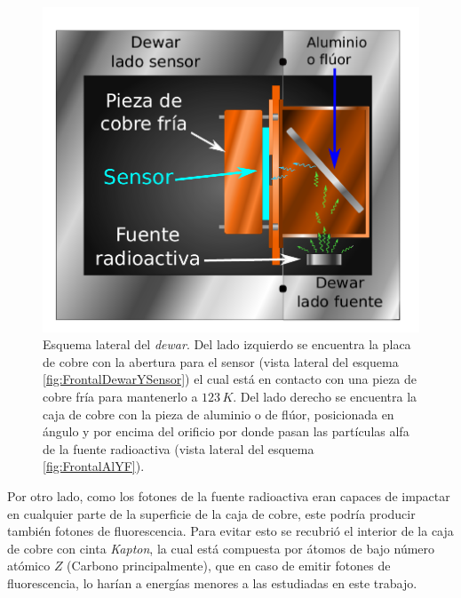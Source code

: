 \begin{figure}%
    \centering
    \includegraphics[scale=0.7]{Figs/LateralDewar.pdf}
    \caption{Esquema lateral del \textit{dewar}. Del lado izquierdo se encuentra la placa de cobre con la abertura para el sensor (vista lateral del esquema \ref{fig:FrontalDewarYSensor}) el cual está en contacto con una pieza de cobre fría para mantenerlo a $123\,\si{K}$. Del lado derecho se encuentra la caja de cobre con la pieza de aluminio o de flúor, posicionada en ángulo y por encima del orificio por donde pasan las partículas alfa de la fuente radioactiva (vista lateral del esquema \ref{fig:FrontalAlYF}).}
    \label{fig:LateralDewar}
\end{figure}
Por otro lado, como los fotones de la fuente radioactiva eran capaces de impactar en cualquier parte de la superficie de la caja de cobre, este podría producir también fotones de fluorescencia. Para evitar esto se recubrió el interior de la caja de cobre con cinta \textit{Kapton}, la cual está compuesta por átomos de bajo número atómico $Z$ (Carbono principalmente), que en caso de emitir fotones de fluorescencia, lo harían a energías menores a las estudiadas en este trabajo.


